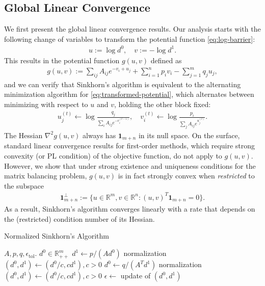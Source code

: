 \subsection{Global Linear Convergence}
\label{subsec:global-linear-convergence}
We first present the global linear convergence results. Our analysis starts with the following change of variables to transform the potential function \eqref{eq:log-barrier}:
\begin{align}
\label{eq:change-of-variables}
    u:=\log d^0,\quad v:=-\log d^1.
\end{align}
This results in the potential function $g(u,v)$ defined as
\begin{align}
\label{eq:transformed-potential}
  g(u,v)	:=\sum_{ij}A_{ij}e^{-v_{i}+u_{j}}+\sum_{i=1}^{n}p_{i}v_{i}-\sum_{j=1}^{m}q_{j}u_{j},
\end{align}
and we can verify that Sinkhorn's algorithm is equivalent to the alternating minimization algorithm \citep{bertsekas1997nonlinear,beck2013convergence} for \eqref{eq:transformed-potential}, which alternates between minimizing with respect to $u$ and $v$, holding the other block fixed:
\begin{align}
   \label{eq:alternating-minimization} u_j^{(t)}\leftarrow  \log \frac{q_j}{\sum_i A_{ij}e^{-v^{(t-1)}_i}},\quad v_i^{(t)}\leftarrow  \log \frac{p_i}{\sum_j A_{ij}e^{u^{(t)}_j}}.
\end{align}
The Hessian $\nabla^2g(u,v)$ always has $\mathbf{1}_{m+n}$ in its null space. On the surface, standard linear convergence results for first-order methods, which require strong convexity (or PL condition) of the objective function, do not apply to $g(u,v)$. However, we show that under strong existence and uniqueness conditions for the matrix balancing problem, $g(u,v)$ is in fact strongly convex when \emph{restricted} to the subspace 
\begin{align*}
   \mathbf{1}_{m+n}^\perp:= \{u\in \mathbb{R}^m,v\in \mathbb{R}^n:(u,v)^T\mathbf{1}_{m+n}=0\}.
\end{align*}
As a result, Sinkhorn's algorithm converges linearly with a rate that depends on the (restricted) condition number of its Hessian. %

\begin{algorithm}[tb]
\caption{Normalized Sinkhorn's Algorithm}
   \label{alg:scaling-normalized}
\begin{algorithmic}
     $A, p, q,\epsilon_{\text{tol}}$.
    $d^{0}\in\mathbb{R}_{++}^{m}$
   \REPEAT
   \STATE $d^{1} \leftarrow  p/( A d^0)$ 
   \STATE 
  normalization  $(d^0,d^1) \leftarrow (d^0/c,c d^1),c>0$
   \STATE $d^{0}\leftarrow  q/({A}^{T} d^{1})$
   \STATE 
  normalization  $(d^0,d^1) \leftarrow (d^0/c,c d^1),c>0$ 
   \STATE 
$\epsilon\leftarrow$  update of $(d^{0},d^1)$
\end{algorithmic}
\end{algorithm}

